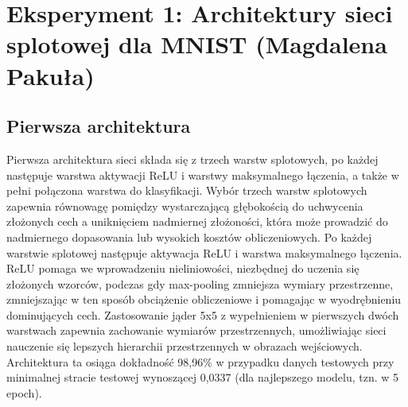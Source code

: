 \documentclass[10pt]{article}
\begin{document}
\pagebreak
\section{Eksperyment 1: Architektury sieci splotowej dla MNIST (Magdalena Pakuła)}\label{sec:ex1-pakula_mnist}

\subsection*{Pierwsza architektura}
Pierwsza architektura sieci składa się z trzech warstw splotowych, po każdej następuje warstwa aktywacji ReLU i warstwy maksymalnego łączenia, a także w pełni połączona warstwa do klasyfikacji.
Wybór trzech warstw splotowych zapewnia równowagę pomiędzy wystarczającą głębokością do uchwycenia złożonych cech a uniknięciem nadmiernej złożoności, która może prowadzić do nadmiernego dopasowania lub wysokich kosztów obliczeniowych.
Po każdej warstwie splotowej następuje aktywacja ReLU i warstwa maksymalnego łączenia. ReLU pomaga we wprowadzeniu nieliniowości, niezbędnej do uczenia się złożonych wzorców, podczas gdy max-pooling zmniejsza wymiary przestrzenne, zmniejszając w ten sposób obciążenie obliczeniowe i pomagając w wyodrębnieniu dominujących cech.
Zastosowanie jąder 5x5 z wypełnieniem w pierwszych dwóch warstwach zapewnia zachowanie wymiarów przestrzennych, umożliwiając sieci nauczenie się lepszych hierarchii przestrzennych w obrazach wejściowych.
Architektura ta osiąga dokładność 98,96\% w przypadku danych testowych przy minimalnej stracie testowej wynoszącej 0,0337 (dla najlepszego modelu, tzn. w 5 epoch).
\end{document}
